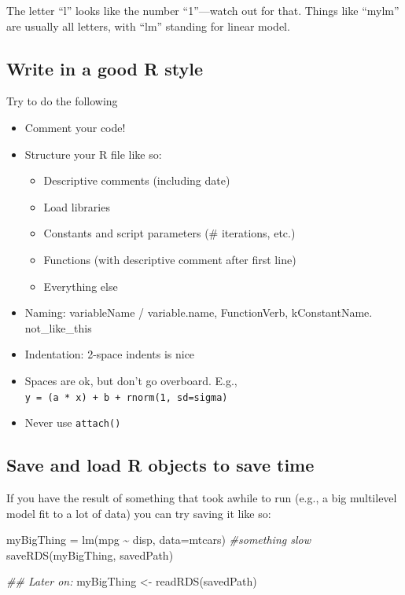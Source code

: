 \documentclass[
  letterpaper,
  DIV=11,
  numbers=noendperiod]{scrreprt}
\newenvironment{Shaded}{\begin{snugshade}}{\end{snugshade}}
\newcommand{\AttributeTok}[1]{\textcolor[rgb]{0.49,0.56,0.16}{#1}}
\newcommand{\CommentTok}[1]{\textcolor[rgb]{0.38,0.63,0.69}{\textit{#1}}}
\newcommand{\DocumentationTok}[1]{\textcolor[rgb]{0.73,0.13,0.13}{\textit{#1}}}
\newcommand{\FunctionTok}[1]{\textcolor[rgb]{0.02,0.16,0.49}{#1}}
\newcommand{\NormalTok}[1]{\textcolor[rgb]{0.00,0.44,0.13}{#1}}
\newcommand{\OtherTok}[1]{\textcolor[rgb]{0.00,0.44,0.13}{#1}}
\newcommand{\SpecialCharTok}[1]{\textcolor[rgb]{0.25,0.44,0.63}{#1}}
\providecommand{\tightlist}{%
  \setlength{\itemsep}{0pt}\setlength{\parskip}{0pt}}\usepackage{longtable,booktabs,array}
\begin{document}
The letter ``l'' looks like the number ``1''---watch out for that.
Things like ``mylm'' are usually all letters, with ``lm'' standing for
linear model.

\hypertarget{write-in-a-good-r-style}{%
\subsection{Write in a good R style}\label{write-in-a-good-r-style}}

Try to do the following

\begin{itemize}
\tightlist
\item
  Comment your code!
\item
  Structure your R file like so:

  \begin{itemize}
  \tightlist
  \item
    Descriptive comments (including date)
  \item
    Load libraries
  \item
    Constants and script parameters (\# iterations, etc.)
  \item
    Functions (with descriptive comment after first line)
  \item
    Everything else
  \end{itemize}
\item
  Naming: variableName / variable.name, FunctionVerb, kConstantName.
  not\_like\_this
\item
  Indentation: 2-space indents is nice
\item
  Spaces are ok, but don't go overboard. E.g.,
  \texttt{y\ =\ (a\ *\ x)\ +\ b\ +\ rnorm(1,\ sd=sigma)}
\item
  Never use \texttt{attach()}
\end{itemize}

\hypertarget{save-and-load-r-objects-to-save-time}{%
\subsection{Save and load R objects to save
time}\label{save-and-load-r-objects-to-save-time}}

If you have the result of something that took awhile to run (e.g., a big
multilevel model fit to a lot of data) you can try saving it like so:

\begin{Shaded}
\begin{Highlighting}[]
\NormalTok{myBigThing }\OtherTok{=} \FunctionTok{lm}\NormalTok{(mpg }\SpecialCharTok{\textasciitilde{}}\NormalTok{ disp, }\AttributeTok{data=}\NormalTok{mtcars) }\CommentTok{\#something slow}
\FunctionTok{saveRDS}\NormalTok{(myBigThing, savedPath)}

\DocumentationTok{\#\# Later on:}
\NormalTok{myBigThing }\OtherTok{\textless{}{-}} \FunctionTok{readRDS}\NormalTok{(savedPath)}
\end{Highlighting}
\end{Shaded}
\end{document}
